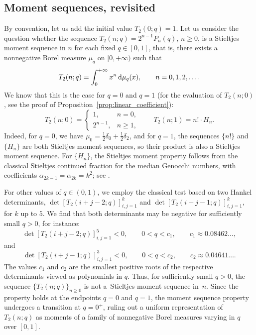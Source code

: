\documentclass[pdftex]{sigma}
\numberwithin{equation}{section}
\theoremstyle{definition}
\begin{document}
\subsection{Moment sequences, revisited}\label{subsec:moment_sequences}

By convention, let us add the initial value $T_2(0;q)=1$.
Let us consider the question whether the sequence $T_2(n;q)=2^{n-1}P_n(q)$,
$n\ge0$, is a Stieltjes moment sequence in $n$ for each fixed $q\in[0,1]$, that
is, there exists a nonnegative Borel measure $\mu_q$ on $[0,+\infty)$ such that
\begin{equation*}
	T_2(n;q)  =  \int_{0}^{+\infty} x^n \, {\rm d}\mu_q(x), \qquad n=0,1,2,\dots.
\end{equation*}
We know that this is the case for $q=0$ and $q=1$ (for the evaluation of
$T_2(n;0)$, see the proof of Proposition~\ref{prop:linear_coefficient}):
\begin{equation*}
	T_2(n;0) =\begin{cases}
		1,       & n=0, \\
		2^{n-1}, & n\ge1,
	\end{cases}
	\qquad T_2(n;1) = n!
	\cdot H_n.
\end{equation*}
Indeed, for $q=0$, we have $\mu_0=\frac{1}{2}\delta_0+\frac{1}{2}\delta_2$, and
for $q=1$, the sequences $\{n!\}$ and $\{H_n\}$ are both Stieltjes moment
sequences, so their product is also a Stieltjes moment sequence.
For $\{H_n\}$, the Stieltjes moment property follows from the classical Stieltjes
continued fraction for the median Genocchi numbers, with coefficients
$\alpha_{2k-1}=\alpha_{2k}=k^2$; see \cite{DebSokal2024}.

For other values of $q\in(0,1)$, we employ the classical test based on two
Hankel determinants, $\det[ T_2(i+j-2;q) ]_{i,j=1}^k$ and
$\det[ T_2(i+j-1;q) ]_{i,j=1}^k$, for $k$ up to $5$.
We find that both determinants may be negative for sufficiently small $q>0$, for
instance:
\begin{equation*}
	\det[ T_2(i+j-2;q) ]_{i,j=1}^5<0,\qquad 0<q<c_1, \qquad c_1\approx
	0.08462\dots,
\end{equation*}
and
\begin{equation*}
	\det[ T_2(i+j-1;q) ]_{i,j=1}^3<0,\qquad 0<q<c_2, \qquad c_2\approx
	0.04641\dots.
\end{equation*}
The values $c_1$ and $c_2$ are the smallest positive roots of the respective
determinants viewed as polynomials in $q$.
Thus, for sufficiently small $q>0$, the sequence $\{T_2(n;q)\}_{n\ge0}$ is not a~Stieltjes moment sequence in~$n$.
Since the property holds at the endpoints $q=0$ and $q=1$, the moment sequence
property undergoes a transition at $q=0^+$, ruling out a uniform representation
of~$T_2(n;q)$ as moments of a family of nonnegative Borel measures varying in
$q$ over $[0,1]$.
\end{document}
